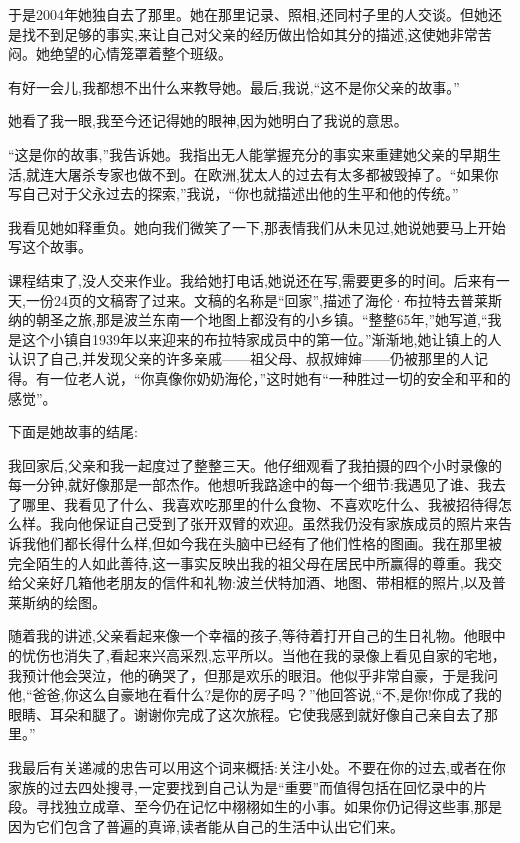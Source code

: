 于是2004年她独自去了那里。她在那里记录、照相,还同村子里的人交谈。但她还是找不到足够的事实,来让自己对父亲的经历做出恰如其分的描述,这使她非常苦闷。她绝望的心情笼罩着整个班级。

有好一会儿,我都想不出什么来教导她。最后,我说,“这不是你父亲的故事。”

她看了我一眼,我至今还记得她的眼神,因为她明白了我说的意思。

“这是你的故事,”我告诉她。我指出无人能掌握充分的事实来重建她父亲的早期生活,就连大屠杀专家也做不到。在欧洲,犹太人的过去有太多都被毁掉了。“如果你写自己对于父永过去的探索,”我说，“你也就描述出他的生平和他的传统。”

我看见她如释重负。她向我们微笑了一下,那表情我们从未见过,她说她要马上开始写这个故事。

课程结束了,没人交来作业。我给她打电话,她说还在写,需要更多的时间。后来有一天,一份24页的文稿寄了过来。文稿的名称是“回家”,描述了海伦·布拉特去普莱斯纳的朝圣之旅,那是波兰东南一个地图上都没有的小乡镇。“整整65年,”她写道,“我是这个小镇自1939年以来迎来的布拉特家成员中的第一位。”渐渐地,她让镇上的人认识了自己,并发现父亲的许多亲戚——祖父母、叔叔婶婶——仍被那里的人记得。有一位老人说，“你真像你奶奶海伦，”这时她有“一种胜过一切的安全和平和的感觉”。

下面是她故事的结尾:

我回家后,父亲和我一起度过了整整三天。他仔细观看了我拍摄的四个小时录像的每一分钟,就好像那是一部杰作。他想听我路途中的每一个细节:我遇见了谁、我去了哪里、我看见了什么、我喜欢吃那里的什么食物、不喜欢吃什么、我被招待得怎么样。我向他保证自己受到了张开双臂的欢迎。虽然我仍没有家族成员的照片来告诉我他们都长得什么样,但如今我在头脑中已经有了他们性格的图画。我在那里被完全陌生的人如此善待,这一事实反映出我的祖父母在居民中所赢得的尊重。我交给父亲好几箱他老朋友的信件和礼物:波兰伏特加酒、地图、带相框的照片,以及普莱斯纳的绘图。

随着我的讲述,父亲看起来像一个幸福的孩子,等待着打开自己的生日礼物。他眼中的忧伤也消失了,看起来兴高采烈,忘平所以。当他在我的录像上看见自家的宅地，我预计他会哭泣，他的确哭了，但那是欢乐的眼泪。他似乎非常自豪，于是我问他,“爸爸,你这么自豪地在看什么?是你的房子吗？”他回答说,“不,是你!你成了我的眼睛、耳朵和腿了。谢谢你完成了这次旅程。它使我感到就好像自己亲自去了那里。”

我最后有关递减的忠告可以用这个词来概括:关注小处。不要在你的过去,或者在你家族的过去四处搜寻,一定要找到自己认为是“重要”而值得包括在回忆录中的片段。寻找独立成章、至今仍在记忆中栩栩如生的小事。如果你仍记得这些事,那是因为它们包含了普遍的真谛,读者能从自己的生活中认出它们来。

